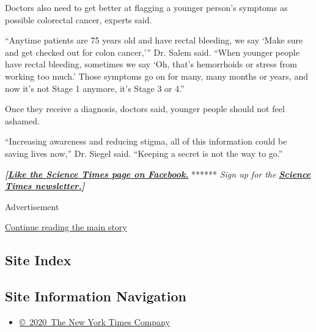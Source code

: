 Doctors also need to get better at flagging a younger person's symptoms
as possible colorectal cancer, experts said.

``Anytime patients are 75 years old and have rectal bleeding, we say
`Make sure and get checked out for colon cancer,''' Dr. Salem said.
``When younger people have rectal bleeding, sometimes we say `Oh, that's
hemorrhoids or stress from working too much.' Those symptoms go on for
many, many months or years, and now it's not Stage 1 anymore, it's Stage
3 or 4.''

Once they receive a diagnosis, doctors said, younger people should not
feel ashamed.

``Increasing awareness and reducing stigma, all of this information
could be saving lives now,'' Dr. Siegel said. ``Keeping a secret is not
the way to go.''

\textbf{\emph{{[}}\href{http://on.fb.me/1paTQ1h}{\emph{Like the Science
Times page on Facebook.}}} ****** \emph{\textbar{} Sign up for the}
\textbf{\href{http://nyti.ms/1MbHaRU}{\emph{Science Times
newsletter.}}\emph{{]}}}

Advertisement

\protect\hyperlink{after-bottom}{Continue reading the main story}

\hypertarget{site-index}{%
\subsection{Site Index}\label{site-index}}

\hypertarget{site-information-navigation}{%
\subsection{Site Information
Navigation}\label{site-information-navigation}}

\begin{itemize}
\tightlist
\item
  \href{https://help.nytimes3xbfgragh.onion/hc/en-us/articles/115014792127-Copyright-notice}{©~2020~The
  New York Times Company}
\end{itemize}

